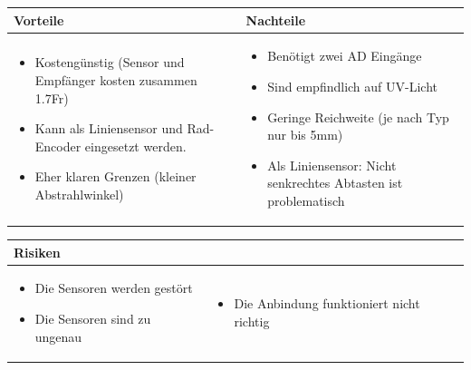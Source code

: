 \begin{table}[h]
\begin{tabular}{p{} | p{}}


\textbf{Vorteile} & \textbf{Nachteile} \\ \hline
	 
\begin{itemize}
\item Kostengünstig (Sensor und Empfänger kosten zusammen 1.7Fr)
\item Kann als Liniensensor und Rad-Encoder eingesetzt werden.
\item Eher klaren Grenzen (kleiner Abstrahlwinkel)
\end{itemize}
 &
\begin{itemize}
\item Benötigt zwei AD Eingänge
\item Sind empfindlich auf UV-Licht
\item Geringe Reichweite (je nach Typ nur bis 5mm)
\item Als Liniensensor: Nicht senkrechtes Abtasten ist problematisch
\end{itemize}
\end{tabular}
\end{table}


\begin{table}[h]
\begin{tabular}{p{}p{}}


 \textbf{Risiken} & \\ \hline
	 
\begin{itemize}
\item Die Sensoren werden gestört
\item Die Sensoren sind zu ungenau
\end{itemize}
&
\begin{itemize}
\item Die Anbindung funktioniert nicht richtig
\end{itemize}

 
\end{tabular}
\end{table}

\pagebreak